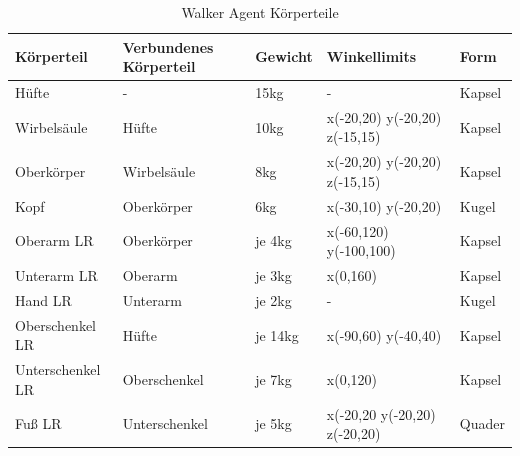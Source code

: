 \begin{table}[H]
  \centering
  {
  \begin{tabular}{ |p{3cm}|p{3cm}|p{2cm}|p{4cm}|p{2cm}| }
  \hline
  Körperteil& Verbundenes Körperteil & Gewicht & Winkellimits & Form \\
  \hline
  Hüfte & - & 15kg & - & Kapsel \\
  Wirbelsäule & Hüfte & 10kg & x(-20,20) y(-20,20) z(-15,15) & Kapsel \\
  Oberkörper & Wirbelsäule & 8kg & x(-20,20) y(-20,20) z(-15,15) & Kapsel \\
  Kopf & Oberkörper & 6kg & x(-30,10) y(-20,20) & Kugel \\
  Oberarm LR & Oberkörper & je 4kg & x(-60,120) y(-100,100) & Kapsel \\
  Unterarm LR & Oberarm & je 3kg & x(0,160) & Kapsel \\
  Hand LR & Unterarm & je 2kg & - & Kugel \\
  Oberschenkel LR & Hüfte & je 14kg& x(-90,60) y(-40,40) & Kapsel \\
  Unterschenkel LR & Oberschenkel & je 7kg &  x(0,120) & Kapsel \\
  Fuß LR & Unterschenkel & je 5kg & x(-20,20 y(-20,20) z(-20,20) & Quader \\
  \hline
  \end{tabular}}
  \caption{Walker Agent Körperteile}
  \label{table:walker_körperteile}
\end{table}

